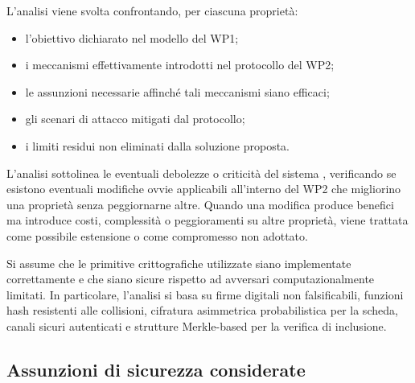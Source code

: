 \documentclass[a4paper,12pt]{article}
\begin{document}
L'analisi viene svolta confrontando, per ciascuna proprietà:

\begin{itemize}
    \item l'obiettivo dichiarato nel modello del WP1;
    \item i meccanismi effettivamente introdotti nel protocollo del WP2;
    \item le assunzioni necessarie affinché tali meccanismi siano efficaci;
    \item gli scenari di attacco mitigati dal protocollo;
    \item i limiti residui non eliminati dalla soluzione proposta.
\end{itemize}

L'analisi sottolinea le eventuali debolezze o criticità del sistema , verificando se esistono eventuali modifiche ovvie applicabili all'interno del WP2 che migliorino una proprietà senza peggiornarne altre.
Quando una modifica produce benefici ma introduce costi, complessità o peggioramenti su altre proprietà, viene trattata come possibile estensione o come compromesso non adottato.

Si assume che le primitive crittografiche utilizzate siano implementate correttamente e che siano sicure rispetto ad avversari computazionalmente limitati.
In particolare, l'analisi si basa su firme digitali non falsificabili, funzioni hash resistenti alle collisioni, cifratura asimmetrica probabilistica per la scheda, canali sicuri autenticati e strutture Merkle-based per la verifica di inclusione.

\subsection{Assunzioni di sicurezza considerate}
\end{document}
